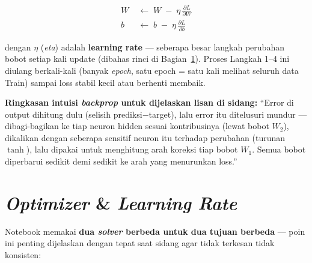 \documentclass[11pt,a4paper]{article}
\begin{document}
\begin{formulabox}
\begin{align}
  W &\;\leftarrow\; W \;-\; \eta\,\frac{\partial L}{\partial W} \\
  b &\;\leftarrow\; b \;-\; \eta\,\frac{\partial L}{\partial b}
\end{align}
\end{formulabox}

dengan $\eta$ (\emph{eta}) adalah \textbf{learning rate} --- seberapa besar langkah
perubahan bobot setiap kali update (dibahas rinci di Bagian~\ref{sec:optimizer}). Proses
Langkah 1--4 ini diulang berkali-kali (banyak \emph{epoch}, satu epoch = satu kali melihat
seluruh data Train) sampai loss stabil kecil atau berhenti membaik.

\begin{verdictbox}
\textbf{Ringkasan intuisi \emph{backprop} untuk dijelaskan lisan di sidang:} ``Error di
output dihitung dulu (selisih prediksi$-$target), lalu error itu ditelusuri mundur ---
dibagi-bagikan ke tiap neuron hidden sesuai kontribusinya (lewat bobot $W_2$), dikalikan
dengan seberapa sensitif neuron itu terhadap perubahan (turunan $\tanh$), lalu dipakai
untuk menghitung arah koreksi tiap bobot $W_1$. Semua bobot diperbarui sedikit demi
sedikit ke arah yang menurunkan loss.''
\end{verdictbox}

\section{\emph{Optimizer} \& \emph{Learning Rate}}
\label{sec:optimizer}

Notebook memakai \textbf{dua \emph{solver} berbeda untuk dua tujuan berbeda} --- poin ini
penting dijelaskan dengan tepat saat sidang agar tidak terkesan tidak konsisten:
\end{document}
